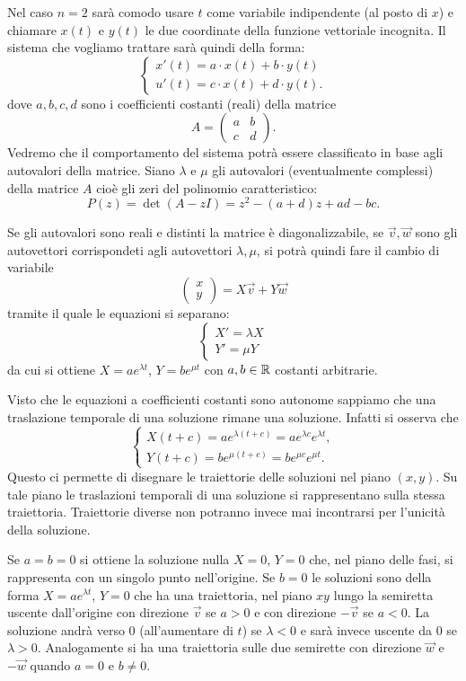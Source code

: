Nel caso $n=2$ sarà comodo usare $t$ come variabile indipendente (al posto di $x$)
e chiamare $x(t)$ e $y(t)$ le due coordinate della funzione vettoriale incognita.
Il sistema che vogliamo trattare sarà quindi della forma:
\[
\begin{cases}
  x'(t) = a\cdot  x(t) + b \cdot y(t)\\
  u'(t) = c\cdot  x(t) + d \cdot y(t).
\end{cases}
\]
dove $a,b,c,d$ sono i coefficienti costanti (reali) della matrice
\[
   A = \begin{pmatrix}
   a & b \\
   c & d
   \end{pmatrix}.
\]
Vedremo che il comportamento del sistema potrà essere classificato in
base agli autovalori della matrice.
Siano $\lambda$ e $\mu$ gli autovalori (eventualmente complessi)
della matrice $A$ cioè gli zeri del polinomio caratteristico:
\[
 P(z)
 = \det (A - z I)
 = z^2 - (a+d) z + ad - bc.
\]

Se gli autovalori sono reali e distinti la matrice è
diagonalizzabile, se $\vec v, \vec w$ sono gli autovettori corrispondeti
agli autovettori $\lambda, \mu$, si potrà quindi fare il cambio
di variabile
\[
\begin{pmatrix} x \\ y \end{pmatrix}
= X \vec v + Y \vec w
\]
tramite il quale le equazioni si separano:
\[
  \begin{cases}
  X' = \lambda X \\
  Y' = \mu Y
  \end{cases}
\]
da cui si ottiene $X = a e^{\lambda t}$, $Y= b e^{\mu t}$
con $a,b\in {\mathbb R}$ costanti arbitrarie.

Visto che le equazioni a coefficienti costanti sono autonome
sappiamo che una traslazione temporale di una soluzione rimane
una soluzione. Infatti si osserva che
\[
\begin{cases}
  X(t+c) = a e^{\lambda (t+c)} = a e^{\lambda c} e^{\lambda t}, \\
  Y(t+c) = b e^{\mu (t+c)} = b e^{\mu c} e^{\mu t}.
\end{cases}
\]
Questo ci permette di disegnare le traiettorie delle soluzioni
nel piano $(x,y)$. Su tale piano le traslazioni temporali
di una soluzione si rappresentano sulla stessa traiettoria.
Traiettorie diverse non potranno invece mai incontrarsi
per l'unicità della soluzione.

Se $a=b=0$ si ottiene la soluzione nulla $X=0$, $Y=0$ che,
nel piano delle fasi, si rappresenta con un singolo punto
nell'origine. Se $b=0$ le soluzioni sono della forma
$X=a e^{\lambda t}$, $Y=0$ che ha una traiettoria,
nel piano $xy$ lungo la semiretta uscente dall'origine
con direzione $\vec v$
se $a>0$ e con direzione $-\vec v$ se $a<0$.
La soluzione andrà verso $0$ (all'aumentare di $t$)
se $\lambda<0$ e sarà invece uscente da $0$ se $\lambda >0$.
Analogamente si ha una traiettoria sulle due semirette
con direzione $\vec w$ e $-\vec w$ quando $a=0$ e $b\neq 0$.

